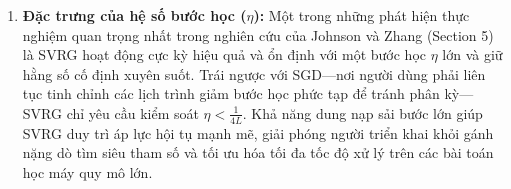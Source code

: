 \begin{enumerate}
\begin{itemize}
    \end{itemize}

    \item \textbf{Đặc trưng của hệ số bước học ($\eta$):} Một trong những phát hiện thực nghiệm quan trọng nhất trong nghiên cứu của Johnson và Zhang \cite{johnson2013accelerating} (Section 5) là SVRG hoạt động cực kỳ hiệu quả và ổn định với một bước học $\eta$ lớn và giữ hằng số cố định xuyên suốt. Trái ngược với SGD—nơi người dùng phải liên tục tinh chỉnh các lịch trình giảm bước học phức tạp để tránh phân kỳ—SVRG chỉ yêu cầu kiểm soát $\eta < \frac{1}{4L}$. Khả năng dung nạp sải bước lớn giúp SVRG duy trì áp lực hội tụ mạnh mẽ, giải phóng người triển khai khỏi gánh nặng dò tìm siêu tham số và tối ưu hóa tối đa tốc độ xử lý trên các bài toán học máy quy mô lớn.

\end{enumerate} 

